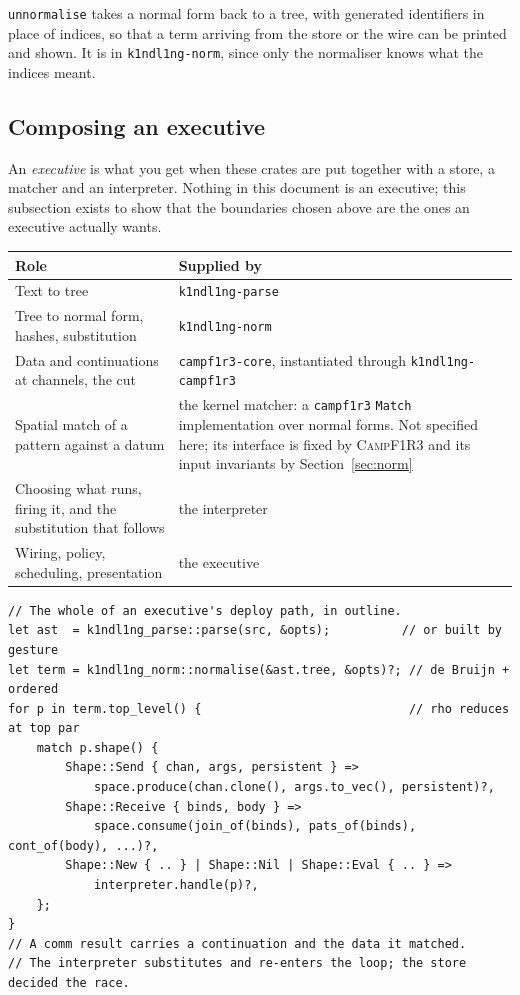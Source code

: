 \documentclass[11pt,a4paper]{article}
\newcommand{\code}[1]{\texttt{#1}}
\newcommand{\Camp}{\textsc{CampF1R3}}
\theoremstyle{definition}
\theoremstyle{plain}
\begin{document}
\code{unnormalise} takes a normal form back to a tree, with generated
identifiers in place of indices, so that a term arriving from the store or the
wire can be printed and shown. It is in \code{k1ndl1ng-norm}, since only the
normaliser knows what the indices meant.

\subsection{Composing an executive}\label{sec:executive}

An \emph{executive} is what you get when these crates are put together with a
store, a matcher and an interpreter. Nothing in this document is an executive;
this subsection exists to show that the boundaries chosen above are the ones an
executive actually wants.

\begin{center}
\begin{tabularx}{\linewidth}{@{}l>{\raggedright\arraybackslash}X@{}}
\toprule
Role & Supplied by\\
\midrule
Text to tree & \code{k1ndl1ng-parse}\\
Tree to normal form, hashes, substitution & \code{k1ndl1ng-norm}\\
Data and continuations at channels, the cut & \code{campf1r3-core}, instantiated
through \code{k1ndl1ng-campf1r3}\\
Spatial match of a pattern against a datum & the kernel matcher: a
\code{campf1r3} \code{Match} implementation over normal forms. Not specified
here; its interface is fixed by \Camp{} and its input invariants by
Section~\ref{sec:norm}\\
Choosing what runs, firing it, and the substitution that follows & the
interpreter\\
Wiring, policy, scheduling, presentation & the executive\\
\bottomrule
\end{tabularx}
\end{center}

\begin{lstlisting}
// The whole of an executive's deploy path, in outline.
let ast  = k1ndl1ng_parse::parse(src, &opts);          // or built by gesture
let term = k1ndl1ng_norm::normalise(&ast.tree, &opts)?; // de Bruijn + ordered
for p in term.top_level() {                             // rho reduces at top par
    match p.shape() {
        Shape::Send { chan, args, persistent } =>
            space.produce(chan.clone(), args.to_vec(), persistent)?,
        Shape::Receive { binds, body } =>
            space.consume(join_of(binds), pats_of(binds), cont_of(body), ...)?,
        Shape::New { .. } | Shape::Nil | Shape::Eval { .. } =>
            interpreter.handle(p)?,
    };
}
// A comm result carries a continuation and the data it matched.
// The interpreter substitutes and re-enters the loop; the store decided the race.
\end{lstlisting}
\end{document}
